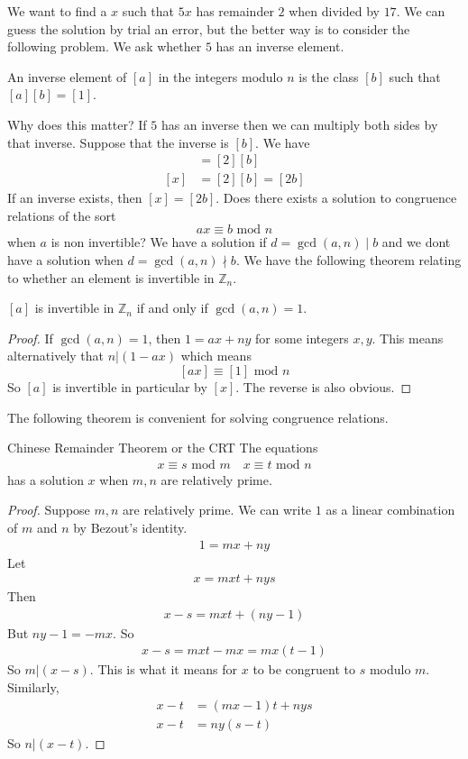 \documentclass{article}
\begin{document}
We want to find a $x$ such that $5x$ has remainder $2$ when divided by $17$. We can guess the solution by trial an error, but the better way is to 
consider the following problem. We ask whether $5$ has an inverse element.
\begin{definition}
    An inverse element of $[a]$ in the integers modulo $n$ is the class $[b]$ such
    that $[a][b]=[1]$.
\end{definition}
Why does this matter? If $5$ has an inverse then we can multiply both sides by that inverse. Suppose that the inverse 
is $[b]$. We have
\begin{align*}
    [5][b][x]&=[2][b] \\
    [x]&=[2][b]=[2b]
\end{align*}
If an inverse exists, then $[x]=[2b]$. Does there exists a solution to congruence relations of the sort 
\[ax\equiv b \text{ mod } n\]
when $a$ is non invertible? We have a solution if $d=\gcd(a,n)\mid b$ and we dont have a solution when $d=\gcd(a,n)\nmid b$.
We have the following theorem relating to whether an element is invertible in $\mathbb{Z}_n$.
\begin{theorem}
    $[a]$ is invertible in $\mathbb{Z}_n$ if and only if $\gcd(a,n)=1$.
\end{theorem}
\begin{proof}
    If $\gcd(a,n)=1$, then $1=ax+ny$ for some integers $x,y$. This means alternatively that $n|(1-ax)$ which means
    \[[ax]\equiv [1] \text{ mod } n\]
    So $[a]$ is invertible in particular by $[x]$. The reverse is also obvious.
\end{proof}
The following theorem is convenient for solving congruence relations.
\begin{theorem}{Chinese Remainder Theorem or the CRT}
    The equations
    \begin{align*}
        x \equiv s \text{ mod } m \quad x \equiv t \text{ mod } n
    \end{align*}
    has a solution $x$ when $m,n$ are relatively prime.
\end{theorem}
\begin{proof}
    Suppose $m,n$ are relatively prime. We can write $1$ as a linear combination of
    $m$ and $n$ by Bezout's identity.
    \begin{align*}
        1=mx+ny
    \end{align*}
    Let \begin{align*}
        x=mxt+nys
    \end{align*}
    Then
    \begin{align*}
        x-s = mxt+(ny-1)
    \end{align*}
    But $ny-1 =-mx$. So 
    \begin{align*}
        x-s = mxt-mx =mx(t-1)
    \end{align*}
    So $m|(x-s)$. This is what it means for $x$ to be congruent to $s$ modulo $m$.
    Similarly, 
    \begin{align*}
        x-t&=(mx-1)t+nys \\
        x-t &= ny(s-t)
    \end{align*}
    So $n|(x-t)$.
\end{proof}
\newpage
\end{document}
